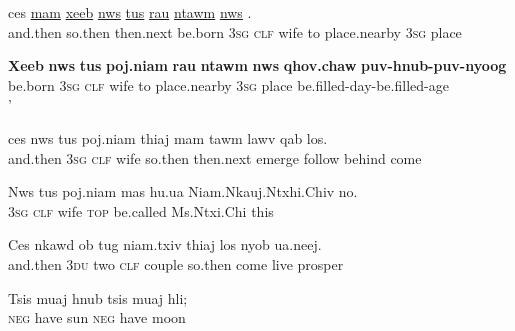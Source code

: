 \documentclass[output=paper]{LSP/langsci}
\begin{document}
\begin{exe}
\ex \label{JaexApp11}
\gll ces \underline{}  \underline{mam} \underline{xeeb} \underline{nws} \underline{tus}  \underline{} \underline{rau} \underline{ntawm} \underline{nws}  \underline{}.\\
     and.then so.then  then.next be.born 3\textsc{sg} \textsc{clf} wife to place.nearby 3\textsc{sg} place\\
\glt  {}
\end{exe}
 
\begin{exe}
\ex \label{JaexApp12}
\gll \textbf{Xeeb} \textbf{nws} \textbf{tus} \textbf{poj.niam} \textbf{rau} \textbf{ntawm} \textbf{nws} \textbf{qhov.chaw} \textbf{puv-hnub-puv-nyoog}\\
     be.born 3\textsc{sg} \textsc{clf} wife to place.nearby 3\textsc{sg} place be.filled-day-be.filled-age\\
\glt {}’
\end{exe}

\begin{exe}
\ex \label{JaexApp13}
\gll ces nws tus poj.niam thiaj mam tawm lawv qab los.\\
and.then 3\textsc{sg} \textsc{clf} wife so.then then.next emerge follow behind come\\
\glt {}
\end{exe}

\begin{exe}
\ex \label{JaexApp14}
\gll Nws tus poj.niam mas hu.ua Niam.Nkauj.Ntxhi.Chiv no.\\
     \textsc{3sg} \textsc{clf} wife \textsc{top} be.called Ms.Ntxi.Chi this\\
\glt {}
\end{exe}

\begin{exe}
\ex \label{JaexApp15}
\gll Ces nkawd ob tug niam.txiv thiaj los nyob ua.neej.\\
     and.then 3\textsc{du} two \textsc{clf} couple so.then come live prosper\\
\glt {}
\end{exe}

\begin{exe}
\ex \label{JaexApp16}
\gll Tsis muaj hnub tsis muaj hli;\\
 \textsc{neg} have sun \textsc{neg} have moon\\
\glt {}
\end{exe}
\end{document}
